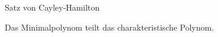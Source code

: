 \documentclass[class=article, crop=false]{standalone}
\begin{document}
\begin{zettel}{Satz von Cayley-Hamilton}

Das Minimalpolynom teilt das charakteristische Polynom.


\end{zettel}
\end{document}

